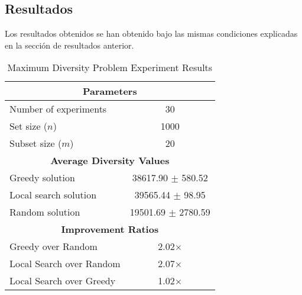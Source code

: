 \documentclass[12pt,letterpaper]{article}
\begin{document}
\subsection{Resultados}
Los resultados obtenidos se han obtenido bajo las mismas condiciones explicadas en la sección de resultados anterior.
\begin{table}[htp]
    \centering
    \begin{tabular}{l c}
        \hline
        \multicolumn{2}{c}{\textbf{Parameters}} \\
        \hline
        Number of experiments & 30 \\
        Set size ($n$) & 1000 \\
        Subset size ($m$) & 20 \\
        \hline
        \multicolumn{2}{c}{\textbf{Average Diversity Values}} \\
        \hline
        Greedy solution & 38617.90 $\pm$ 580.52 \\
        Local search solution & 39565.44 $\pm$ 98.95 \\
        Random solution & 19501.69 $\pm$ 2780.59 \\
        \hline
        \multicolumn{2}{c}{\textbf{Improvement Ratios}} \\
        \hline
        Greedy over Random & 2.02$\times$ \\
        Local Search over Random & 2.07$\times$ \\
        Local Search over Greedy & 1.02$\times$ \\
        \hline
    \end{tabular}
    \caption{Maximum Diversity Problem Experiment Results}
    \label{tab:mdp_results_2}
\end{table}
\end{document}
